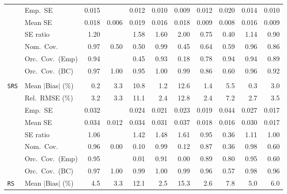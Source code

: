 \begin{landscape}
\begin{longtable}{llrrrrrrrrr}
 & Emp.\ SE & 0.015 &  & 0.012 & 0.010 & 0.009 & 0.012 & 0.020 & 0.014 & 0.010 \\
 & Mean SE & 0.018 & 0.006 & 0.019 & 0.016 & 0.018 & 0.009 & 0.008 & 0.016 & 0.009 \\
 & SE ratio & \cellcolor{rankthree}1.20 &  & 1.58 & 1.60 & 2.00 & 0.75 & 0.40 & \cellcolor{ranktwo}1.14 & \cellcolor{rankone}0.90 \\
 & Nom.\ Cov. & \cellcolor{ranktwo}0.97 & 0.50 & 0.50 & \cellcolor{rankthree}0.99 & 0.45 & 0.64 & 0.59 & \cellcolor{rankone}0.96 & 0.86 \\
 & Orc.\ Cov.\ (Emp) & \cellcolor{rankone}0.94 &  & 0.45 & \cellcolor{ranktwo}0.93 & 0.18 & 0.78 & \cellcolor{rankone}0.94 & \cellcolor{rankone}0.94 & \cellcolor{rankthree}0.89 \\
 & Orc.\ Cov.\ (BC) & \cellcolor{rankthree}0.97 & 1.00 & \cellcolor{rankone}0.95 & 1.00 & 0.99 & 0.86 & 0.60 & \cellcolor{ranktwo}0.96 & 0.92 \\
\addlinespace[2pt]
\multicolumn{11}{l}{\textbf{Continuous Phase-One Covariates}} \\
\addlinespace[2pt]
\quad \texttt{SRS} & Mean $|$Bias$|$ (\%) & \cellcolor{rankone}0.2 & 3.3 & 10.8 & \cellcolor{rankthree}1.2 & 12.6 & 1.4 & 5.5 & \cellcolor{ranktwo}0.3 & 3.0 \\
 & Rel.\ RMSE (\%) & \cellcolor{rankthree}3.2 & 3.3 & 11.1 & \cellcolor{rankone}2.4 & 12.8 & \cellcolor{rankone}2.4 & 7.2 & \cellcolor{ranktwo}2.7 & 3.5 \\
 & Emp.\ SE & 0.032 &  & 0.024 & 0.021 & 0.023 & 0.019 & 0.044 & 0.027 & 0.017 \\
 & Mean SE & 0.034 & 0.012 & 0.034 & 0.031 & 0.037 & 0.018 & 0.016 & 0.030 & 0.017 \\
 & SE ratio & \cellcolor{rankthree}1.06 &  & 1.42 & 1.48 & 1.61 & \cellcolor{ranktwo}0.95 & 0.36 & 1.11 & \cellcolor{rankone}1.00 \\
 & Nom.\ Cov. & \cellcolor{rankone}0.96 & 0.00 & 0.10 & \cellcolor{rankthree}0.99 & 0.12 & 0.87 & 0.36 & \cellcolor{ranktwo}0.98 & 0.60 \\
 & Orc.\ Cov.\ (Emp) & \cellcolor{rankone}0.95 &  & 0.01 & \cellcolor{ranktwo}0.91 & 0.00 & \cellcolor{rankthree}0.89 & 0.80 & \cellcolor{rankone}0.95 & 0.60 \\
 & Orc.\ Cov.\ (BC) & \cellcolor{ranktwo}0.97 & 1.00 & 0.99 & 1.00 & 0.99 & \cellcolor{rankone}0.96 & 0.57 & \cellcolor{rankthree}0.98 & \cellcolor{rankone}0.96 \\
\addlinespace[2pt]
\quad \texttt{RS} & Mean $|$Bias$|$ (\%) & 4.5 & \cellcolor{rankthree}3.3 & 12.1 & \cellcolor{rankone}2.5 & 15.3 & \cellcolor{ranktwo}2.6 & 7.8 & 5.0 & 6.0 \\

\end{longtable}
\end{landscape}
